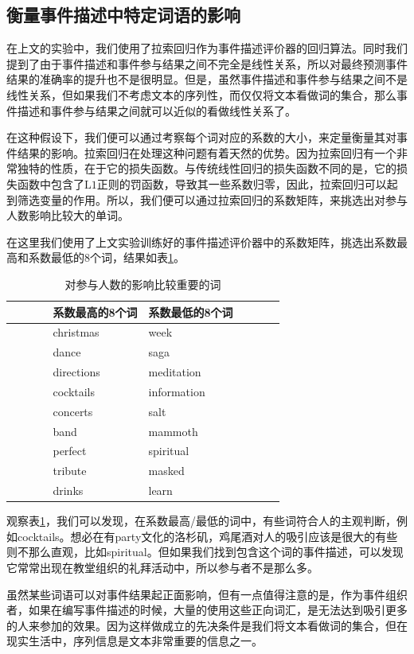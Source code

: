 \documentclass[12pt]{template}
\begin{document}
\subsection{衡量事件描述中特定词语的影响}
在上文的实验中，我们使用了拉索回归作为事件描述评价器的回归算法。同时我们提到了由于事件描述和事件参与结果之间不完全是线性关系，所以对最终预测事件结果的准确率的提升也不是很明显。但是，虽然事件描述和事件参与结果之间不是线性关系，但如果我们不考虑文本的序列性，而仅仅将文本看做词的集合，那么事件描述和事件参与结果之间就可以近似的看做线性关系了。

在这种假设下，我们便可以通过考察每个词对应的系数的大小，来定量衡量其对事件结果的影响。拉索回归在处理这种问题有着天然的优势。因为拉索回归有一个非常独特的性质，在于它的损失函数。与传统线性回归的损失函数不同的是，它的损失函数中包含了$\mathrm{L1}$正则的罚函数，导致其一些系数归零，因此，拉索回归可以起到筛选变量的作用\citep{tibshirani_regression_1996}。所以，我们便可以通过拉索回归的系数矩阵，来挑选出对参与人数影响比较大的单词\citep{noauthor_predicting_nodate}。

在这里我们使用了上文实验训练好的事件描述评价器中的系数矩阵，挑选出系数最高和系数最低的8个词，结果如表\ref{t1-2}。

\begin{table}[htbp]
\caption{\label{t1-2}对参与人数的影响比较重要的词}
  \centering
    \begin{tabular*}{\linewidth}{p{0.15\linewidth}p{0.35\linewidth}p{0.35\linewidth}p{0.15\linewidth}}
\toprule      
    &系数最高的8个词 & 系数最低的8个词&\tabularnewline
\midrule
&christmas & week&\tabularnewline
&dance & saga&\tabularnewline
&directions & meditation&\tabularnewline
&cocktails & information&\tabularnewline
&concerts & salt&\tabularnewline
&band & mammoth&\tabularnewline
&perfect & spiritual&\tabularnewline
&tribute & masked&\tabularnewline
&drinks & learn&\tabularnewline
\bottomrule
    \end{tabular*}
\end{table}

观察表\ref{t1-2}，我们可以发现，在系数最高/最低的词中，有些词符合人的主观判断，例如cocktails。想必在有party文化的洛杉矶，鸡尾酒对人的吸引应该是很大的有些则不那么直观，比如spiritual。但如果我们找到包含这个词的事件描述，可以发现它常常出现在教堂组织的礼拜活动中，所以参与者不是那么多。

虽然某些词语可以对事件结果起正面影响，但有一点值得注意的是，作为事件组织者，如果在编写事件描述的时候，大量的使用这些正向词汇，是无法达到吸引更多的人来参加的效果。因为这样做成立的先决条件是我们将文本看做词的集合，但在现实生活中，序列信息是文本非常重要的信息之一。
\end{document}

